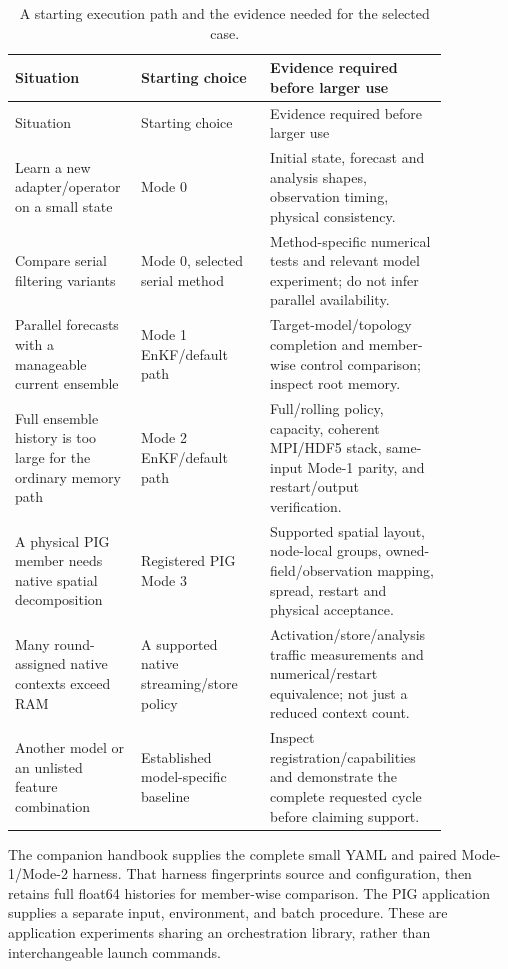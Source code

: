 \documentclass[11pt,a4paper]{article}
\begin{document}
\begingroup\small\setlength{\tabcolsep}{3pt}
\begin{longtable}{p{0.24\linewidth}p{0.28\linewidth}p{0.34\linewidth}}
\caption{A starting execution path and the evidence needed for the selected case.}\label{tab:modechoice}\\
\toprule
Situation & Starting choice & Evidence required before larger use\\\midrule\endfirsthead
\toprule Situation & Starting choice & Evidence required before larger use\\\midrule\endhead
Learn a new adapter/operator on a small state & Mode 0 & Initial state, forecast and analysis shapes, observation timing, physical consistency.\\
Compare serial filtering variants & Mode 0, selected serial method & Method-specific numerical tests and relevant model experiment; do not infer parallel availability.\\
Parallel forecasts with a manageable current ensemble & Mode 1 EnKF/default path & Target-model/topology completion and member-wise control comparison; inspect root memory.\\
Full ensemble history is too large for the ordinary memory path & Mode 2 EnKF/default path & Full/rolling policy, capacity, coherent MPI/HDF5 stack, same-input Mode-1 parity, and restart/output verification.\\
A physical PIG member needs native spatial decomposition & Registered PIG Mode 3 & Supported spatial layout, node-local groups, owned-field/observation mapping, spread, restart and physical acceptance.\\
Many round-assigned native contexts exceed RAM & A supported native streaming/store policy & Activation/store/analysis traffic measurements and numerical/restart equivalence; not just a reduced context count.\\
Another model or an unlisted feature combination & Established model-specific baseline & Inspect registration/capabilities and demonstrate the complete requested cycle before claiming support.\\
\bottomrule\end{longtable}\endgroup


The companion handbook supplies the complete small YAML and paired Mode-1/Mode-2 harness. That harness fingerprints source and configuration, then retains full float64 histories for member-wise comparison. The PIG application supplies a separate input, environment, and batch procedure. These are application experiments sharing an orchestration library, rather than interchangeable launch commands.
\end{document}
